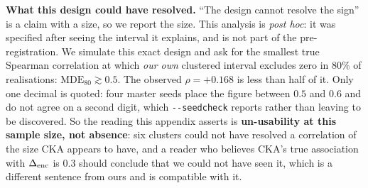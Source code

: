 \textbf{What this design could have resolved.} ``The design cannot resolve the
sign'' is a claim with a size, so we report the size. This analysis is \emph{post hoc}:
it was specified after seeing the interval it explains, and is not part of
the pre-registration.  We simulate this exact design and ask for the smallest
true Spearman correlation at which \emph{our own} clustered interval excludes zero
in $80\%$ of realisations: $\mathrm{MDE}_{80}{\gtrsim}0.5$. The observed
$\rho{=}{+}0.168$ is less than half of it.
Only one decimal is quoted: four master
seeds place the figure between $0.5$ and $0.6$ and do not agree on a second digit,
which \texttt{-{}-seedcheck} reports rather than leaving to be discovered. So the
reading this appendix asserts is \textbf{un-usability at this sample size, not
absence}: six clusters could not have resolved a correlation of the size CKA
appears to have, and a reader who believes CKA's true association with $\Delta_\text{enc}$ is
$0.3$ should conclude that we could not have seen it, which is a different
sentence from ours and is compatible with it.

